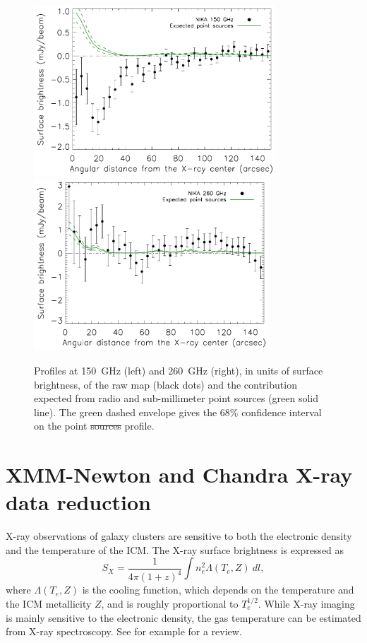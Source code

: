 \documentclass[twocolumn,traditabstract]{aa}
\providecommand{\DIFaddtex}[1]{{\protect\color{blue}\uwave{#1}}} %
\providecommand{\DIFdeltex}[1]{{\protect\color{red}\sout{#1}}}                      %
\providecommand{\DIFaddend}{} %
\providecommand{\DIFaddFL}[1]{\DIFadd{#1}} %
\providecommand{\DIFdelFL}[1]{\DIFdel{#1}} %
\providecommand{\DIFaddbeginFL}{} %
\providecommand{\DIFaddendFL}{} %
\providecommand{\DIFdelbeginFL}{} %
\providecommand{\DIFdelendFL}{} %
\providecommand{\DIFadd}[1]{\texorpdfstring{\DIFaddtex{#1}}{#1}} %
\providecommand{\DIFdel}[1]{\texorpdfstring{\DIFdeltex{#1}}{}} %
\begin{document}
\DIFaddend \begin{figure}[h]
\centering
\includegraphics[height=6.4cm]{Figure/MACSJ1424_profile2mm_plus_ps.pdf}
\includegraphics[height=6.4cm]{Figure/MACSJ1424_profile1mm_plus_ps.pdf}
\caption{\DIFaddbeginFL \footnotesize \DIFaddendFL Profiles at 150~GHz (left) and 260~GHz (right), in units of surface brightness, of the raw map (black dots) and the contribution expected from radio and sub-millimeter point sources (green solid line). The green dashed envelope gives the 68\% confidence interval on the point \DIFdelbeginFL \DIFdelFL{sources }\DIFdelendFL \DIFaddbeginFL \DIFaddFL{source }\DIFaddendFL profile.}
\label{fig:flux_profiles}
\end{figure}

\section{XMM-Newton and Chandra X-ray data reduction}\label{sec:XMM_Newton_and_Chandra_X_ray_data_reduction}
X-ray observations of galaxy clusters are sensitive to both the electronic density and the temperature of the ICM. The X-ray surface brightness is expressed as 
\begin{equation}
	S_X = \frac{1}{4 \pi \left(1+z\right)^4} \int n_e^2 \Lambda(T_e, Z) \ dl,
	\label{eq:sx}
\end{equation}
where $\Lambda(T_e,Z)$ is the cooling function, which depends on the temperature and the ICM metallicity $Z$, and is roughly proportional to $T_e^{1/2}$. While X-ray imaging is mainly sensitive to the electronic density, the gas temperature can be estimated from X-ray spectroscopy. See for example \cite{bohringer2010} for a review.
\end{document}
